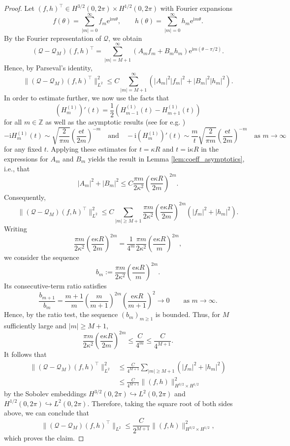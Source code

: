 \documentclass{article}
\begin{document}
\begin{proof}
Let $(f,h)^{\top}\in H^{3/2}(0,2\pi)\times H^{1/2}(0,2\pi)$
with Fourier expansions
\[
f(\theta)=\sum_{|m|=0}^\infty f_m\mathrm e^{\mathrm im\theta},
\qquad
h(\theta)=\sum_{|m|=0}^\infty h_m\mathrm e^{\mathrm im\theta}.
\]
By the Fourier representation of $\mathcal Q$, we obtain
\[
(\mathcal Q-\mathcal Q_M)(f,h)^\top
=
\sum_{|m|=M+1}^\infty
(A_mf_m+B_mh_m)\mathrm e^{\mathrm im(\theta-\pi/2)}.
\]
Hence, by Parseval's identity,
\[
\|(\mathcal Q-\mathcal Q_M)(f,h)^\top\|_{L^2}^2
\leq
C\sum_{|m|=M+1}^\infty
\left(
|A_m|^2|f_m|^2+
|B_m|^2|h_m|^2
\right).
\]
In order to estimate further, we now use the facts that
\[
(H_m^{(1)})'(t) = \frac{1}{2}\left(H_{m-1}^{(1)}(t)-H_{m+1}^{(1)}(t)\right)
\]
for all $m\in \mathbb Z$ as well as the asymptotic results (see for e.g. \cite{NIST:DLMF})
\[
-\mathrm iH_m^{(1)}(t) \sim \sqrt{\frac{2}{\pi m}}\left(\frac{\mathrm et}{2m}\right)^{-m}
\quad \text{and} \quad
-\mathrm i(H_m^{(1)})'(t) \sim \frac{m}{t}\sqrt{\frac{2}{\pi m}}\left(\frac{\mathrm et}{2m}\right)^{-m}\quad \text{as }m\to \infty
\]
for any fixed $t$. Applying these estimates for $t=\kappa R$ and $t=\mathrm i\kappa R$ in the expressions for $A_m$ and $B_m$ yields the result in Lemma \ref{lem:coeff_asymptotics}, i.e., that
\[
|A_m|^2+|B_m|^2
\leq
C\frac{\pi m}{2\kappa^2}
\left(\frac{\mathrm e\kappa R}{2m}\right)^{2m}.
\]
Consequently,
\[
\|(\mathcal Q-\mathcal Q_M)(f,h)^\top\|_{L^2}^2
\leq
C\sum_{|m|\geq M+1}
\frac{\pi m}{2\kappa^2}
\left(\frac{\mathrm e\kappa R}{2m}\right)^{2m}
\left(|f_m|^2+|h_m|^2\right).
\]
Writing
\[
\frac{\pi m}{2\kappa^2}
\left(\frac{\mathrm e\kappa R}{2m}\right)^{2m}
=
\frac{1}{4^m}
\frac{\pi m}{2\kappa^2}
\left(\frac{\mathrm e\kappa R}{m}\right)^{2m},
\]
we consider the sequence
\[
b_m:=
\frac{\pi m}{2\kappa^2}
\left(\frac{\mathrm e\kappa R}{m}\right)^{2m}.
\]
Its consecutive-term ratio satisfies
\[
\frac{b_{m+1}}{b_m}
=
\frac{m+1}{m}
\left(\frac{m}{m+1}\right)^{2m}
\left(\frac{\mathrm e\kappa R}{m+1}\right)^2
\longrightarrow 0
\qquad\text{as }m\to\infty.
\]
Hence, by the ratio test, the sequence $(b_m)_{m\geq 1}$ is bounded.
Thus, for $M$ sufficiently large and $|m|\geq M+1$,
\[
\frac{\pi m}{2\kappa^2}
\left(\frac{\mathrm e\kappa R}{2m}\right)^{2m}
\leq
\frac{C}{4^m}
\leq
\frac{C}{4^{M+1}}.
\]
It follows that
\[
\begin{aligned}
\|(\mathcal Q-\mathcal Q_M)(f,h)^\top\|_{L^2}^2
&\leq
\frac{C}{4^{M+1}}
\sum_{|m|\geq M+1}
\left(|f_m|^2+|h_m|^2\right)\\
&\leq
\frac{C}{4^{M+1}}
\|(f,h)\|_{H^{3/2}\times H^{1/2}}^2
\end{aligned}
\]
by the Sobolev embeddings
$H^{3/2}(0,2\pi)\hookrightarrow L^2(0,2\pi)$ and
$H^{1/2}(0,2\pi)\hookrightarrow L^2(0,2\pi)$. Therefore, taking the square root of both sides above, we can conclude that
\[
\|(\mathcal Q-\mathcal Q_M)(f,h)^\top\|_{L^2}
\leq
\frac{C}{2^{M+1}}
\|(f,h)\|_{H^{3/2}\times H^{1/2}}^2,
\] 
which proves the claim.
\end{proof}
\end{document}

